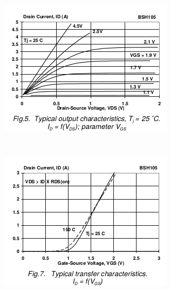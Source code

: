 \documentclass{../template/tp}
\begin{document}
\begin{figure}[h!]
    \centering
    
    \begin{subfigure}[b]{0.49\linewidth}
        \includegraphics[width=\linewidth]
            {datasheet_transistor_sortie.png}
        \caption{}
        \label{fig:Sortie}
    \end{subfigure}%
    ~
    \begin{subfigure}[b]{0.49\linewidth}
        \includegraphics[width=\linewidth]
            {datasheet_transistor_transfer.png}
        \caption{}
        \label{fig:Transfer}
    \end{subfigure}


\end{figure}
\end{document}
